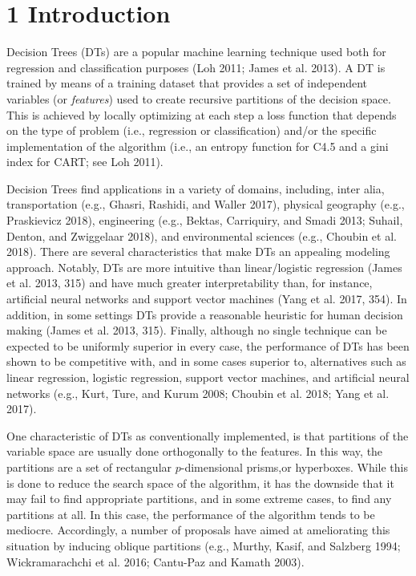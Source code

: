 \documentclass[]{elsarticle} %
\begin{document}
\section{1 Introduction}\label{introduction}

Decision Trees (DTs) are a popular machine learning technique used both
for regression and classification purposes (Loh 2011; James et al.
2013). A DT is trained by means of a training dataset that provides a
set of independent variables (or \emph{features}) used to create
recursive partitions of the decision space. This is achieved by locally
optimizing at each step a loss function that depends on the type of
problem (i.e., regression or classification) and/or the specific
implementation of the algorithm (i.e., an entropy function for C4.5 and
a gini index for CART; see Loh 2011).

Decision Trees find applications in a variety of domains, including,
inter alia, transportation (e.g., Ghasri, Rashidi, and Waller 2017),
physical geography (e.g., Praskievicz 2018), engineering (e.g., Bektas,
Carriquiry, and Smadi 2013; Suhail, Denton, and Zwiggelaar 2018), and
environmental sciences (e.g., Choubin et al. 2018). There are several
characteristics that make DTs an appealing modeling approach. Notably,
DTs are more intuitive than linear/logistic regression (James et al.
2013, 315) and have much greater interpretability than, for instance,
artificial neural networks and support vector machines (Yang et al.
2017, 354). In addition, in some settings DTs provide a reasonable
heuristic for human decision making (James et al. 2013, 315). Finally,
although no single technique can be expected to be uniformly superior in
every case, the performance of DTs has been shown to be competitive
with, and in some cases superior to, alternatives such as linear
regression, logistic regression, support vector machines, and artificial
neural networks (e.g., Kurt, Ture, and Kurum 2008; Choubin et al. 2018;
Yang et al. 2017).

One characteristic of DTs as conventionally implemented, is that
partitions of the variable space are usually done orthogonally to the
features. In this way, the partitions are a set of rectangular
\(p\)-dimensional prisms,or hyperboxes. While this is done to reduce the
search space of the algorithm, it has the downside that it may fail to
find appropriate partitions, and in some extreme cases, to find any
partitions at all. In this case, the performance of the algorithm tends
to be mediocre. Accordingly, a number of proposals have aimed at
ameliorating this situation by inducing oblique partitions (e.g.,
Murthy, Kasif, and Salzberg 1994; Wickramarachchi et al. 2016; Cantu-Paz
and Kamath 2003).
\end{document}
